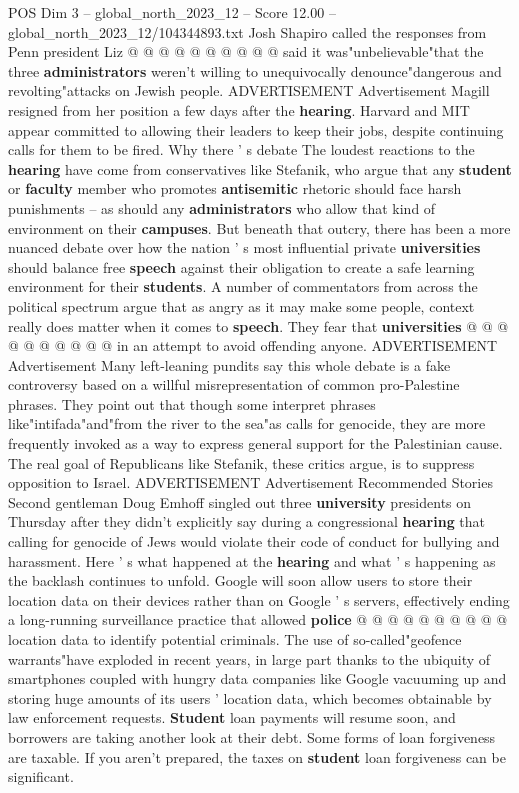 \begin{textsample}{POS Dim 3 – global\_north\_2023\_12 – Score 12.00 – global\_north\_2023\_12/104344893.txt}
Josh Shapiro called the responses from Penn president Liz @ @ @ @ @ @ @ @ @ @ said it was"unbelievable"that the three \textbf{administrators} weren't willing to unequivocally denounce"dangerous and revolting"attacks on Jewish people.
ADVERTISEMENT Advertisement Magill resigned from her position a few days after the \textbf{hearing}.
Harvard and MIT appear committed to allowing their leaders to keep their jobs, despite continuing calls for them to be fired.
Why there ' s debate The loudest reactions to the \textbf{hearing} have come from conservatives like Stefanik, who argue that any \textbf{student} or \textbf{faculty} member who promotes \textbf{antisemitic} rhetoric should face harsh punishments -- as should any \textbf{administrators} who allow that kind of environment on their \textbf{campuses}.
But beneath that outcry, there has been a more nuanced debate over how the nation ' s most influential private \textbf{universities} should balance free \textbf{speech} against their obligation to create a safe learning environment for their \textbf{students}.
A number of commentators from across the political spectrum argue that as angry as it may make some people, context really does matter when it comes to \textbf{speech}.
They fear that \textbf{universities} @ @ @ @ @ @ @ @ @ @ in an attempt to avoid offending anyone.
ADVERTISEMENT Advertisement Many left-leaning pundits say this whole debate is a fake controversy based on a willful misrepresentation of common pro-Palestine phrases.
They point out that though some interpret phrases like"intifada"and"from the river to the sea"as calls for genocide, they are more frequently invoked as a way to express general support for the Palestinian cause.
The real goal of Republicans like Stefanik, these critics argue, is to suppress opposition to Israel.
ADVERTISEMENT Advertisement Recommended Stories Second gentleman Doug Emhoff singled out three \textbf{university} presidents on Thursday after they didn't explicitly say during a congressional \textbf{hearing} that calling for genocide of Jews would violate their code of conduct for bullying and harassment.
Here ' s what happened at the \textbf{hearing} and what ' s happening as the backlash continues to unfold.
Google will soon allow users to store their location data on their devices rather than on Google ' s servers, effectively ending a long-running surveillance practice that allowed \textbf{police} @ @ @ @ @ @ @ @ @ @ location data to identify potential criminals.
The use of so-called"geofence warrants"have exploded in recent years, in large part thanks to the ubiquity of smartphones coupled with hungry data companies like Google vacuuming up and storing huge amounts of its users ' location data, which becomes obtainable by law enforcement requests. \textbf{Student} loan payments will resume soon, and borrowers are taking another look at their debt.
Some forms of loan forgiveness are taxable.
If you aren't prepared, the taxes on \textbf{student} loan forgiveness can be significant.

\end{textsample}
